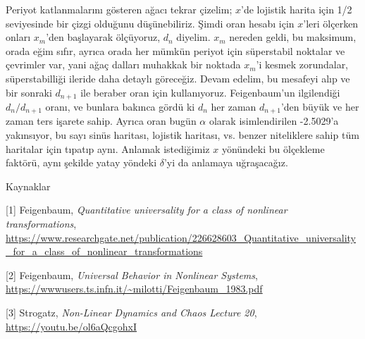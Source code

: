 \documentclass[12pt,fleqn]{article}\usepackage{../../common}
\begin{document}
Periyot katlanmalarını gösteren ağacı tekrar çizelim; $x$'de lojistik harita
için 1/2 seviyesinde bir çizgi olduğunu düşünebiliriz. Şimdi oran hesabı için
$x$'leri ölçerken onları $x_m$'den başlayarak ölçüyoruz, $d_n$ diyelim. $x_m$
nereden geldi, bu maksimum, orada eğim sıfır, ayrıca orada her mümkün periyot
için süperstabil noktalar ve çevrimler var, yani ağaç dalları muhakkak bir
noktada $x_m$'i kesmek zorundalar, süperstabilliği ileride daha detaylı
göreceğiz. Devam edelim, bu mesafeyi alıp ve bir sonraki $d_{n+1}$ ile beraber
oran için kullanıyoruz. Feigenbaum'un ilgilendiği $d_n / d_{n+1}$ oranı, ve
bunlara bakınca gördü ki $d_n$ her zaman $d_{n+1}$'den büyük ve her zaman ters
işarete sahip. Ayrıca oran bugün $\alpha$ olarak isimlendirilen -2.5029'a
yakınsıyor, bu sayı sinüs haritası, lojistik haritası, vs. benzer niteliklere
sahip tüm haritalar için tıpatıp aynı. Anlamak istediğimiz $x$ yönündeki bu
ölçekleme faktörü, aynı şekilde yatay yöndeki $\delta$'yi da anlamaya
uğraşacağız.

Kaynaklar

[1] Feigenbaum, {\em Quantitative universality for a class of nonlinear transformations}, \url{https://www.researchgate.net/publication/226628603_Quantitative_universality_for_a_class_of_nonlinear_transformations}

[2] Feigenbaum, {\em Universal Behavior in Nonlinear Systems}, \url{https://wwwusers.ts.infn.it/~milotti/Feigenbaum_1983.pdf}

[3] Strogatz, {\em Non-Linear Dynamics and Chaos Lecture 20}, \url{https://youtu.be/ol6aQcgohxI}
\end{document}
